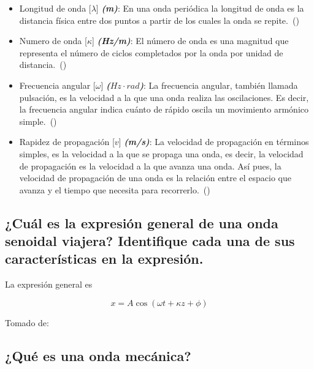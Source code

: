 \documentclass[twocolumn, 12pt]{article}
\newcommand{\bolditalic}[1]{\textbf{\textit{#1}}}
\begin{document}
\begin{itemize}[label=$\triangleright$]
    \item Longitud de onda [$\lambda$] \bolditalic{(m)}: En una onda
          periódica la longitud de onda es la distancia física entre
          dos puntos a partir de los cuales la onda se
          repite.~(\cite{ESERO})

    \item Numero de onda [$\kappa$] \bolditalic{(Hz/m)}: El número de
          onda es una magnitud que representa el número de ciclos
          completados por la onda por unidad de
          distancia.~(\cite{Ingenierizando_2023})

    \item Frecuencia angular [$\omega$] \bolditalic{($Hz \cdot
                  rad$)}: La frecuencia angular, también llamada pulsación,
          es la velocidad a la que una onda realiza las oscilaciones.
          Es decir, la frecuencia angular indica cuánto de rápido
          oscila un movimiento armónico
          simple.~(\cite{Ingenierizando_2023b})

    \item Rapidez de propagación [$v$] \bolditalic{(m/s)}: La
          velocidad de propagación en términos simples, es la
          velocidad a la que se propaga una onda, es decir, la
          velocidad de propagación es la velocidad a la que avanza
          una onda. Así pues, la velocidad de propagación de una onda
          es la relación entre el espacio que avanza y el tiempo que
          necesita para recorrerlo.~(\cite{Ingenierizando_2023c})
\end{itemize}

\subsection{¿Cuál es la expresión general de una onda senoidal viajera? Identifique cada una de sus
    características en la expresión.}

La expresión general es

\begin{equation*}
    x = A \cos (\omega t + \kappa z + \phi)
\end{equation*}

Tomado de:~\cite{ONDAS}

\subsection{¿Qué es una onda mecánica?}
\end{document}
